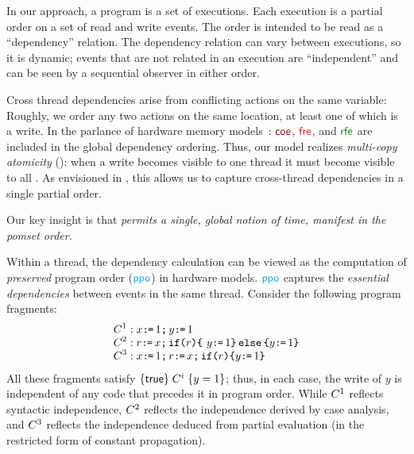 
In our approach, a program is a set of executions.  Each execution is a
partial order on a set of read and write events.  The order is intended to be
read as a ``dependency'' relation.  The dependency relation can vary between
executions, so it is dynamic; events that are not related in an execution are
``independent'' and can be seen by a sequential observer in either order.

Cross thread dependencies arise from conflicting actions on the same
variable: Roughly, we order any two actions on the same location, at least
one of which is a write.  In the parlance of hardware memory
models~\citep{alglave}: $\rcoe$, $\rfre$, and $\rrfex$ are included in the
global dependency ordering.  Thus, our model realizes \emph{multi-copy
  atomicity} (\mca): when a write becomes visible to one thread it must
become visible to all
\citep{DBLP:journals/pacmpl/PulteFDFSS18}.  As envisioned in
\cite[]{AlglaveThesis}, this allows us to capture cross-thread
dependencies in a single partial order.

Our key insight is that \emph{\mca{} permits a single, global notion of time,
  manifest in the pomset order}.
  

Within a thread, the dependency calculation can be viewed as the computation
of \emph{preserved} program order ($\rppo$) in hardware models.  $\rppo$
captures the \emph{essential dependencies} between events in the same thread.
Consider the following program fragments: \begingroup \allowdisplaybreaks
\begin{align*}
  & C^1: x \texttt{:}\mkern-1mu\texttt{=}\, 1 \texttt{;}\,\allowbreak y \texttt{:}\mkern-1mu\texttt{=}\, 1
  \\[-1ex] & C^2: r \texttt{:}\mkern-1mu\texttt{=}\, x \texttt{;}\,\allowbreak \texttt{if}\allowbreak\texttt{(}r\texttt{)} \allowbreak\texttt{\{}\ y \texttt{:}\mkern-1mu\texttt{=}\, 1 \texttt{\}}\,\allowbreak\texttt{else}\allowbreak\,\texttt{\{} y \texttt{:}\mkern-1mu\texttt{=}\, 1  \texttt{\}}
  \\[-1ex] & C^3: x \texttt{:}\mkern-1mu\texttt{=}\, 1 \texttt{;}\,\allowbreak r \texttt{:}\mkern-1mu\texttt{=}\, x \texttt{;}\,\allowbreak \texttt{if}\allowbreak\texttt{(}r\texttt{)} \allowbreak\texttt{\{} y \texttt{:}\mkern-1mu\texttt{=}\, 1 \texttt{\}}
\end{align*}
\endgroup
All these fragments satisfy $\{\mathsf{true}\}\allowbreak\;C^i\;\allowbreak\{y =1\}$; thus, in each
case, the write of $y$ is independent of any code that precedes it in program
order. While $C^1$ reflects syntactic independence, $C^2$ reflects
the independence derived by case analysis, and $C^3$ reflects the
independence deduced from partial evaluation (in the restricted form of
constant propagation).


